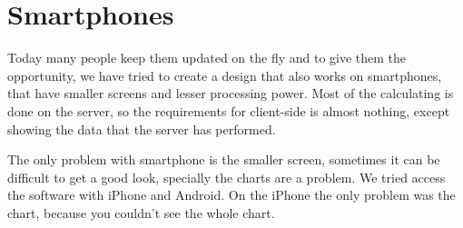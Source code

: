 \chapter{Smartphones}
Today many people keep them updated on the fly and to give them the opportunity, we have tried to create a design that also works on smartphones, that have smaller screens and lesser processing power. Most of the calculating is done on the server, so the requirements for client-side is almost nothing, except showing the data that the server has performed.

The only problem with smartphone is the smaller screen, sometimes it can be difficult to get a good look, specially the charts are a problem.
We tried access the software with iPhone and Android. On the iPhone the only problem was the chart, because you couldn't see the whole chart.